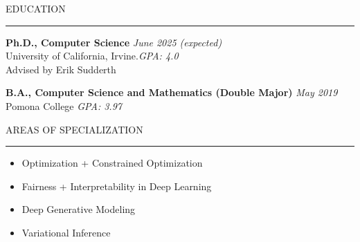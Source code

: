 \documentclass{resume} %
\renewenvironment{rSection}[1]{
\sectionskip
\textcolor{CarnegieMellonRed}{\MakeUppercase{#1}}
\sectionlineskip
\hrule
\begin{list}{}{
\setlength{\leftmargin}{1.5em}
}
\item[]
}{
\end{list}
}
\begin{document}
\begin{rSection}{Education}
{\bf Ph.D., Computer Science} \hfill {\em June 2025 (expected)} 
\\ University of California, Irvine.\hfill {\em GPA: 4.0}
\\ Advised by Erik Sudderth

{\bf B.A., Computer Science and Mathematics (Double Major)} \hfill {\em May 2019} 
\\ Pomona College \hfill {\em GPA: 3.97}

\end{rSection}

\begin{rSection}{Areas of Specialization}
\begin{multicols}{2}
\begin{itemize}
    \item Optimization + Constrained Optimization
    \item Fairness + Interpretability in Deep Learning
    \item Deep Generative Modeling
    \item Variational Inference
\end{itemize}
\end{multicols}
\end{rSection}
\end{document}
